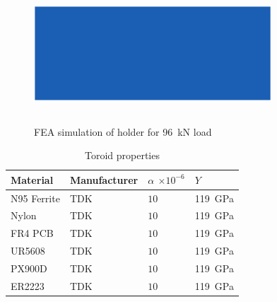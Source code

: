 \documentclass[conference]{IEEEtran}
\begin{document}
\begin{figure}
  \centering
  \includegraphics[width=3.5in, height=2in]{figures/holderfea.pdf}
  \caption{FEA simulation of holder for \SI{96}{\kilo\newton} load}
  \label{fig:holderfea}
\end{figure}
\begin{table}
  \centering
  \caption{Toroid properties}
  \begin{tabular}{@{}llll@{}}
    \toprule
    Material & Manufacturer & $\alpha$ $\times 10^{-6}$ & $Y$ \\ \midrule
    N95 Ferrite & TDK & $10$ & \SI{119}{\giga\pascal} \\
    Nylon & TDK & $10$ & \SI{119}{\giga\pascal} \\
    FR4 PCB & TDK & $10$ & \SI{119}{\giga\pascal} \\
    UR5608 & TDK & $10$ & \SI{119}{\giga\pascal} \\
    PX900D & TDK & $10$ & \SI{119}{\giga\pascal} \\
    ER2223 & TDK & $10$ & \SI{119}{\giga\pascal} \\
    \bottomrule
  \end{tabular}
\end{table}
\end{document}
